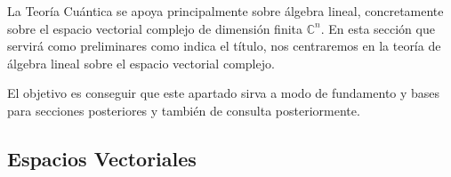 \documentclass[a4paper]{article}
\numberwithin{equation}{section}
\begin{document}
La Teoría Cuántica se apoya principalmente sobre álgebra lineal, concretamente sobre el espacio vectorial complejo de dimensión finita $\mathbb{C}^n$.
En esta sección que servirá como preliminares como indica el título, nos centraremos en la teoría de álgebra lineal sobre el espacio vectorial complejo. 


El objetivo es conseguir que este apartado sirva a modo de fundamento y bases para secciones posteriores y también de consulta posteriormente.

\subsection{Espacios Vectoriales}

\end{document}
